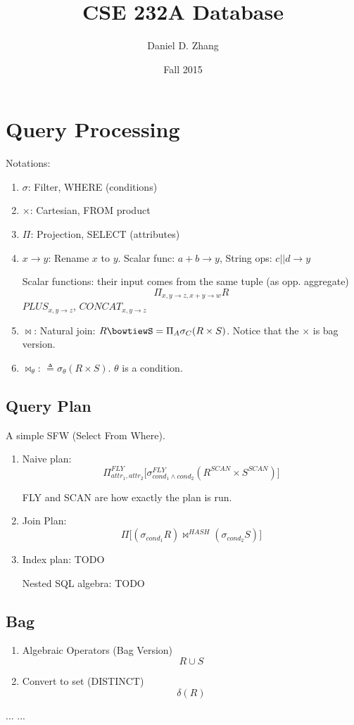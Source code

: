 \documentclass{article}
\begin{document}
\title{CSE 232A Database}
\author{Daniel D. Zhang}
\date{Fall 2015}
\maketitle

\newcommand{\ra}{\rightarrow}
\newcommand{\Ra}{\Rightarrow}


\tableofcontents
\section{Query Processing}
Notations:
\begin{enumerate}
\item $\sigma$: Filter, WHERE (conditions)
\item $\times$: Cartesian, FROM product 
\item $\Pi$: Projection, SELECT (attributes)
\item $x\ra y$: Rename $x$ to $y$. Scalar func: $a+b\ra y$, String ops: $c||d \ra y$

Scalar functions: their input comes from the same tuple (as opp. aggregate)
$$
\Pi_{x, y\ra z, x+y\ra w} R
$$
$PLUS_{x, y\ra z}$, $CONCAT_{x,y\ra z}$
\item $\bowtie$: Natural join: $R\bowtiewS = \Pi_A\sigma_C(R\times S)$. Notice that the $\times$ is bag version. 
\item $\bowtie_{\theta}$: $\triangleq \sigma_{\theta} (R\times S)$. $\theta$ is a condition. 
\end{enumerate}
\subsection{Query Plan}
A simple SFW (Select From Where). 
\begin{enumerate}
\item Naive plan:
$$
\Pi_{attr_1,attr_2}^{FLY}\Big[\sigma_{cond_1\wedge cond_2}^{FLY} (R^{SCAN}\times S^{SCAN})\Big]
$$

FLY and SCAN are how exactly the plan is run. 

\item Join Plan:
$$
\Pi \Big[(\sigma_{cond_1}R)  \bowtie^{HASH} (\sigma_{cond_2}S) \Big]
$$
\item Index plan:
TODO
$$

$$

Nested SQL algebra:
TODO
\end{enumerate}

\subsection{Bag}
\begin{enumerate}
\item Algebraic Operators (Bag Version)
$$
R\cup S
$$
\item Convert to set (DISTINCT)
$$
\delta(R)
$$
\end{enumerate}

\begin{thebibliography}{99}
 ...
 ...
\end{thebibliography}
\end{document}
